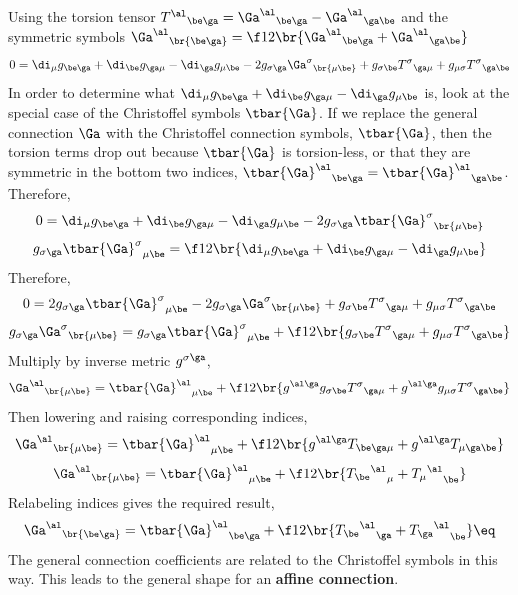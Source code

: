 \documentclass{article}
\begin{document}
Using the torsion tensor ${T^{\al}}_{\be\ga} = {\Ga^{\al}}_{\be\ga}- {\Ga^{\al}}_{\ga\be}$ and the symmetric symbols ${\Ga^{\al}}_{\br{\be\ga}} = \f12\br{{\Ga^{\al}}_{\be\ga} + {\Ga^{\al}}_{\ga\be}}$
\[ 0 = \di_\mu g_{\be\ga} + \di_\be g_{\ga\mu} - \di_\ga g_{\mu\be}- 2g_{\sigma\ga} {\Ga^\sigma}_{\br{\mu\be}}+ g_{\sigma\be} {T^\sigma}_{\ga\mu}  + g_{\mu\sigma}  {T^\sigma}_{\ga\be} \]
In order to determine what $\di_\mu g_{\be\ga} + \di_\be g_{\ga\mu} - \di_\ga g_{\mu\be}$ is, look at the special case of the Christoffel symbols $\tbar{\Ga}$. If we replace the general connection $\Ga$ with the Christoffel connection symbols, $\tbar{\Ga}$, then the torsion terms drop out because $\tbar{\Ga}$ is torsion-less, or that they are symmetric in the bottom two indices, ${\tbar{\Ga}^{\al}}_{\be\ga} = {\tbar{\Ga}^{\al}}_{\ga\be}$. Therefore,
\[ 0 = \di_\mu g_{\be\ga} + \di_\be g_{\ga\mu} - \di_\ga g_{\mu\be}- 2g_{\sigma\ga} {\tbar{\Ga}^\sigma}_{\br{\mu\be}} \]
\[ g_{\sigma\ga} {\tbar{\Ga}^\sigma}_{\mu\be} = \f12 \br{\di_\mu g_{\be\ga} + \di_\be g_{\ga\mu} - \di_\ga g_{\mu\be}} \]
Therefore,
\[ 0 = 2g_{\sigma\ga} {\tbar{\Ga}^\sigma}_{\mu\be}- 2g_{\sigma\ga} {\Ga^\sigma}_{\br{\mu\be}}+ g_{\sigma\be} {T^\sigma}_{\ga\mu}  + g_{\mu\sigma}  {T^\sigma}_{\ga\be} \]
\[ g_{\sigma\ga} {\Ga^\sigma}_{\br{\mu\be}} = g_{\sigma\ga} {\tbar{\Ga}^\sigma}_{\mu\be} + \f12\br{g_{\sigma\be} {T^\sigma}_{\ga\mu}  + g_{\mu\sigma}  {T^\sigma}_{\ga\be}} \]
Multiply by inverse metric $g^{\sigma\ga}$,
\[  {\Ga^\al}_{\br{\mu\be}} = {\tbar{\Ga}^\al}_{\mu\be} + \f12\br{g^{\al\ga}g_{\sigma\be} {T^\sigma}_{\ga\mu}  + g^{\al\ga}g_{\mu\sigma}  {T^\sigma}_{\ga\be}} \]
Then lowering and raising corresponding indices,
\[  {\Ga^\al}_{\br{\mu\be}} = {\tbar{\Ga}^\al}_{\mu\be} + \f12\br{g^{\al\ga} {T}_{\be\ga\mu}  + g^{\al\ga}{T}_{\mu\ga\be}} \]
\[  {\Ga^\al}_{\br{\mu\be}} = {\tbar{\Ga}^\al}_{\mu\be} + \f12\br{{{T_{\be}}^{\al}}_\mu  + {{T_{\mu}}^{\al}}_\be} \]
Relabeling indices gives the required result,
\[  {\Ga^\al}_{\br{\be\ga}} = {\tbar{\Ga}^\al}_{\be\ga} + \f12\br{{{T_{\be}}^{\al}}_\ga  + {{T_{\ga}}^{\al}}_\be} \eq \label{eq:4}\]
The general connection coefficients are related to the Christoffel symbols in this way. This leads to the general shape for an \textbf{affine connection}.\\
\end{document}
